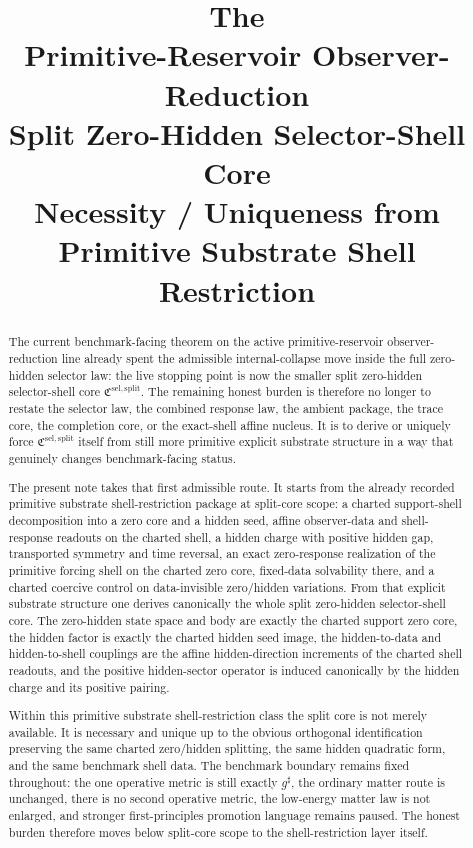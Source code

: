 \documentclass[11pt]{article}
\title{\textbf{The \TheoryName{}}\\[0.4em]
\large Primitive-Reservoir Observer-Reduction\\
\large Split Zero-Hidden Selector-Shell Core\\
\large Necessity / Uniqueness from Primitive Substrate Shell Restriction}
\author{}
\date{}
\newcommand{\CompletedMetric}{g^{\sharp}}
\newcommand{\SelectorCore}{\mathfrak C^{\mathrm{sel,split}}}
\begin{document}
\maketitle

\begin{abstract}
The current benchmark-facing theorem on the active primitive-reservoir observer-reduction line already spent the admissible internal-collapse move inside the full zero-hidden selector law: the live stopping point is now the smaller split zero-hidden selector-shell core \(\SelectorCore\). The remaining honest burden is therefore no longer to restate the selector law, the combined response law, the ambient package, the trace core, the completion core, or the exact-shell affine nucleus. It is to derive or uniquely force \(\SelectorCore\) itself from still more primitive explicit substrate structure in a way that genuinely changes benchmark-facing status.

The present note takes that first admissible route. It starts from the already recorded primitive substrate shell-restriction package at split-core scope: a charted support-shell decomposition into a zero core and a hidden seed, affine observer-data and shell-response readouts on the charted shell, a hidden charge with positive hidden gap, transported symmetry and time reversal, an exact zero-response realization of the primitive forcing shell on the charted zero core, fixed-data solvability there, and a charted coercive control on data-invisible zero/hidden variations. From that explicit substrate structure one derives canonically the whole split zero-hidden selector-shell core. The zero-hidden state space and body are exactly the charted support zero core, the hidden factor is exactly the charted hidden seed image, the hidden-to-data and hidden-to-shell couplings are the affine hidden-direction increments of the charted shell readouts, and the positive hidden-sector operator is induced canonically by the hidden charge and its positive pairing.

Within this primitive substrate shell-restriction class the split core is not merely available. It is necessary and unique up to the obvious orthogonal identification preserving the same charted zero/hidden splitting, the same hidden quadratic form, and the same benchmark shell data. The benchmark boundary remains fixed throughout: the one operative metric is still exactly \(\CompletedMetric\), the ordinary matter route is unchanged, there is no second operative metric, the low-energy matter law is not enlarged, and stronger first-principles promotion language remains paused. The honest burden therefore moves below split-core scope to the shell-restriction layer itself.
\end{abstract}
\end{document}
